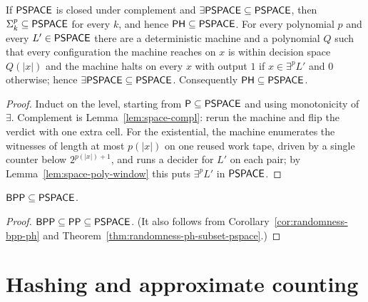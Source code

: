 \begin{theorem}
  \label{thm:randomness-ph-subset-pspace}
  \leanok
  If $\mathsf{PSPACE}$ is closed under complement and $\exists \mathsf{PSPACE}
  \subseteq \mathsf{PSPACE}$, then $\Sigma^p_k \subseteq \mathsf{PSPACE}$ for every
  $k$, and hence $\mathsf{PH} \subseteq \mathsf{PSPACE}$. For every polynomial $p$ and
  every $L' \in \mathsf{PSPACE}$ there are a deterministic machine and a polynomial
  $Q$ such that every configuration the machine reaches on $x$ is within
  decision space $Q(|x|)$ and the machine halts on every $x$ with output $1$
  if $x \in \exists^p L'$ and $0$ otherwise; hence $\exists \mathsf{PSPACE}
  \subseteq \mathsf{PSPACE}$. Consequently $\mathsf{PH} \subseteq \mathsf{PSPACE}$.
\end{theorem}
\begin{proof}
  \leanok
  Induct on the level, starting from $\mathsf{P} \subseteq \mathsf{PSPACE}$ and using
  monotonicity of $\exists$. Complement is Lemma~\ref{lem:space-compl}: rerun
  the machine and flip the verdict with one extra cell. For the existential, the
  machine enumerates the witnesses of length at most $p(|x|)$ on one reused
  work tape, driven by a single counter below $2^{p(|x|)+1}$, and runs a
  decider for $L'$ on each pair; by Lemma~\ref{lem:space-poly-window} this puts
  $\exists^p L'$ in $\mathsf{PSPACE}$.
\end{proof}

\begin{corollary}
  \label{cor:randomness-bpp-pspace}
  \leanok
  $\mathsf{BPP} \subseteq \mathsf{PSPACE}$.
\end{corollary}
\begin{proof}
  \leanok
  $\mathsf{BPP} \subseteq \mathsf{PP} \subseteq \mathsf{PSPACE}$. (It also follows from
  Corollary~\ref{cor:randomness-bpp-ph} and
  Theorem~\ref{thm:randomness-ph-subset-pspace}.)
\end{proof}

\section{Hashing and approximate counting}


